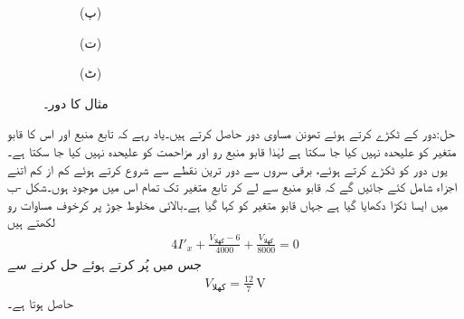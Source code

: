 \begin{figure}
\begin{subfigure}{0.5\textwidth}
\begin{tikzpicture}
\end{tikzpicture}
\caption*{(پ)}
\end{subfigure}%
\begin{subfigure}{0.5\textwidth}
\centering
{}
\caption*{(ت)}
\end{subfigure}
\begin{subfigure}{0.5\textwidth}
\centering
{}
\caption*{(ٹ)}
\end{subfigure}%
\caption{مثال  کا دور۔}
\label{شکل_مسئلہ_تابع_غیر_تابع_مثال_الف}
\end{figure}

حل:دور کے ٹکڑے کرتے ہوئے تھونن مساوی دور حاصل کرتے ہیں۔یاد رہے کہ تابع منبع  اور اس کا قابو متغیر کو علیحدہ نہیں کیا جا سکتا ہے لہٰذا قابو منبع رو اور  مزاحمت کو علیحدہ نہیں کیا جا سکتا ہے۔یوں دور کو ٹکڑے کرتے ہوئے، برقی سروں سے دور ترین نقطے سے شروع کرتے ہوئے  کم از کم اتنے اجزاء شامل کئے جائیں گے کہ قابو منبع سے لے کر تابع متغیر تک تمام اس میں موجود ہوں۔شکل -ب میں ایسا ٹکڑا دکھایا گیا ہے جہاں قابو متغیر کو  کہا گیا ہے۔بالائی  مخلوط جوڑ پر کرخوف مساوات رو لکھتے ہیں
\begin{align*}
4 I'_x+\frac{V_{\text{کھلا}}-6}{4000}+\frac{V_{\text{کھلا}}}{8000}=0
\end{align*}
جس میں  پُر کرتے ہوئے حل کرنے سے 
\begin{align*}
V_{\text{کھلا}}=\frac{12}{7} \, \si{\volt}
\end{align*}
حاصل ہوتا ہے۔

